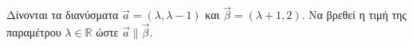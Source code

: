 Δίνονται τα διανύσματα $ \vec{a}=(\lambda,\lambda-1) $ και $ \vec{\beta}=(\lambda+1,2) $. Να βρεθεί η τιμή της παραμέτρου $ \lambda\in\mathbb{R} $ ώστε $ \vec{a}\parallel\vec{\beta} $.
